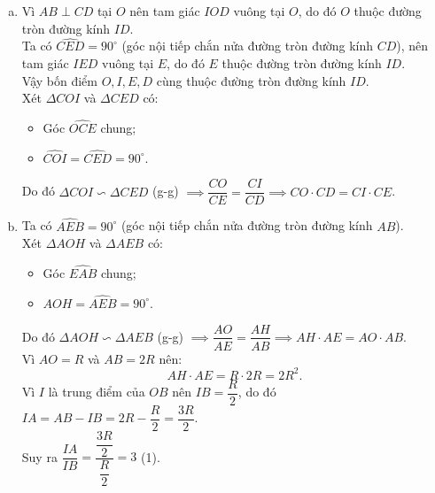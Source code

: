 \begin{bt}
{\begin{center}
\end{center}
\begin{enumerate}[a)]
	\item Vì $AB \perp CD$ tại $O$ nên tam giác $IOD$ vuông tại $O$, do đó $O$ thuộc đường tròn đường kính $ID$.\\
	Ta có $\widehat{CED} = 90^\circ$ (góc nội tiếp chắn nửa đường tròn đường kính $CD$), nên tam giác $IED$ vuông tại $E$, do đó $E$ thuộc đường tròn đường kính $ID$.\\
	Vậy bốn điểm $O, I, E, D$ cùng thuộc đường tròn đường kính $ID$.\\
	Xét $\Delta COI$ và $\Delta CED$ có:
	\begin{itemize}
		\item Góc $\widehat{OCE}$ chung;
		\item $\widehat{COI} = \widehat{CED} = 90^\circ$.
	\end{itemize}
	Do đó $\Delta COI \backsim \Delta CED$ (g-g) $\implies \dfrac{CO}{CE} = \dfrac{CI}{CD} \implies CO \cdot CD = CI \cdot CE$.
	\item Ta có $\widehat{AEB} = 90^\circ$ (góc nội tiếp chắn nửa đường tròn đường kính $AB$).\\
	Xét $\Delta AOH$ và $\Delta AEB$ có:
	\begin{itemize}
		\item Góc $\widehat{EAB}$ chung;
		\item $\widehat{AOH} = \widehat{AEB} = 90^\circ$.
	\end{itemize}
	Do đó $\Delta AOH \backsim \Delta AEB$ (g-g) $\implies \dfrac{AO}{AE} = \dfrac{AH}{AB} \implies AH \cdot AE = AO \cdot AB$.\\
	Vì $AO = R$ và $AB = 2R$ nên:
	$$AH \cdot AE = R \cdot 2R = 2R^2.$$
	Vì $I$ là trung điểm của $OB$ nên $IB = \dfrac{R}{2}$, do đó $IA = AB - IB = 2R - \dfrac{R}{2} = \dfrac{3R}{2}$.\\
	Suy ra $\dfrac{IA}{IB} = \dfrac{\dfrac{3R}{2}}{\dfrac{R}{2}} = 3$ (1).\\

\end{enumerate}}
\end{bt}
